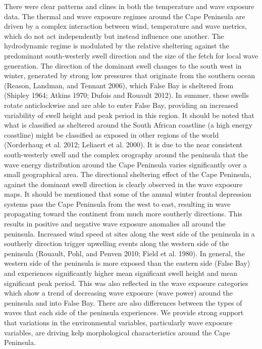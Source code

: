 \documentclass[
  a4paper,
]{article}
\begin{document}
There were clear patterns and clines in both the temperature and wave
exposure data. The thermal and wave exposure regimes around the Cape
Peninsula are driven by a complex interaction between wind, temperature
and wave metrics, which do not act independently but instead influence
one another. The hydrodynamic regime is modulated by the relative
sheltering against the predominant south-westerly swell direction and
the size of the fetch for local wave generation. The direction of the
dominant swell changes to the south west in winter, generated by strong
low pressures that originate from the southern ocean (Reason, Landman,
and Tennant 2006), which False Bay is sheltered from (Shipley 1964;
Atkins 1970; Dufois and Rouault 2012). In summer, these swells rotate
anticlockwise and are able to enter False Bay, providing an increased
variability of swell height and peak period in this region. It should be
noted that what is classified as sheltered around the South African
coastline (a high energy coastline) might be classified as exposed in
other regions of the world (Norderhaug et al. 2012; Leliaert et al.
2000). It is due to the near consistent south-westerly swell and the
complex orography around the peninsula that the wave energy distribution
around the Cape Peninsula varies significantly over a small geographical
area. The directional sheltering effect of the Cape Peninsula, against
the dominant swell direction is clearly observed in the wave exposure
maps. It should be mentioned that some of the annual winter frontal
depression systems pass the Cape Peninsula from the west to east,
resulting in wave propagating toward the continent from much more
southerly directions. This results in positive and negative wave
exposure anomalies all around the peninsula. Increased wind speed at
sites along the west side of the peninsula in a southerly direction
trigger upwelling events along the western side of the peninsula
(Rouault, Pohl, and Penven 2010; Field et al. 1980). In general, the
western side of the peninsula is more exposed than the eastern side
(False Bay) and experiences significantly higher mean significant swell
height and mean significant peak period. This was also reflected in the
wave exposure categories which show a trend of decreasing wave exposure
(wave power) around the peninsula and into False Bay. There are also
differences between the types of waves that each side of the peninsula
experiences. We provide strong support that variations in the
environmental variables, particularly wave exposure variables, are
driving kelp morphological characteristics around the Cape Peninsula.
\end{document}
